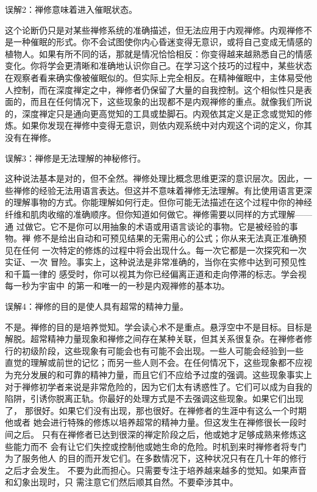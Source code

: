 \subsectnon 误解2：禅修意味着进入催眠状态。

这个论断仍只是对某些禅修系统的准确描述，但无法应用于内观禅修。内观禅修不
是一种催眠的形式。你不会试图使你内心昏迷变得无意识，或将自己变成无情感的
植物人。如果有所不同的话，那就是情况恰恰相反：你变得越来越熟悉自己的情感
变化。你将学会更清晰和准确地认识你自己。在学习这个技巧的过程中，某些状态
在观察者看来确实像被催眠似的。但实际上完全相反。在精神催眠中，主体易受他
人控制，而在深度禅定之中，禅修者仍保留了大量的自我控制。这个相似性只是表
面的，而且在任何情况下，这些现象的出现都不是内观禅修的重点。就像我们所说
的，深度禅定只是通向更高觉知的工具或垫脚石。内观依其定义是正念或觉知的修
炼。如果你发现在禅修中变得无意识，则依内观系统中对内观这个词的定义，你其
没有在禅修。

\subsectnon \1误解3：禅修是无法理解的神秘修行。

这种说法基本是对的，但不全然。禅修处理比概念思维更深的意识层次。因此，一
些禅修的经验无法用语言表达。但这并不意味着禅修无法理解。有比使用语言更深
的理解事物的方式。你能理解如何行走。但你可能无法描述在这个过程中你的神经
纤维和肌肉收缩的准确顺序。但你知道如何做它。禅修需要以同样的方式理解——通
过做它。它不是你可以用抽象的术语或用语言谈论的事物。它是被经验的事物。禅
修不是给出自动和可预见结果的无需用心的公式；你从来无法真正准确预见在任何
一次特定的修炼的过程中将会出现什么。每一次它都是一次探究和一次实证、一次
冒险。事实上，这种说法是非常准确的，当你在实修中达到可预见性和千篇一律的
感受时，你可以视其为你已经偏离正道和走向停滞的标志。学会视每一秒为宇宙中
的第一和唯一的一秒是内观禅修的基本功。

\subsectnon 误解4：禅修的目的是使人具有超常的精神力量。

不是。禅修的目的是培养觉知。学会读心术不是重点。悬浮空中不是目标。目标是
解脱。超常精神力量现象和禅修之间存在某种关联，但其关系很复杂。在禅修者修
行的初级阶段，这些现象有可能会也有可能不会出现。一些人可能会\1经验到一些
直觉的理解或前世的记忆；而另一些人则不会。在任何情况下，这些现象都不应视
为充分发展的和可靠的精神力量，而且它们不应给予过度的强调。这些现象事实上
对于禅修初学者来说是非常危险的，因为它们太有诱惑性了。它们可以成为自我的
陷阱，引诱你脱离正轨。你最好的处理方式是不去强调这些现象。如果它们出现了，
那很好。如果它们没有出现，那也很好。在禅修者的生涯中有这么一个时期他或者
她会进行特殊的修炼以培养超常的精神力量。但这发生在禅修很长一段时间之后。
只有在禅修者已达到很深的禅定阶段之后，他或她才足够成熟来修炼这些能力而不
会有让它们失控或控制他或她生命的危险。时机到来时禅修者将专门为了服务他人
的目的而开发它们。在多数情况下，这种状况只有在几十年的修行之后才会发生。
不要为此而担心。只需要专注于培养越来越多的觉知。如果声音和幻象出现时，只
需注意它们然后顺其自然。不要牵涉其中。

